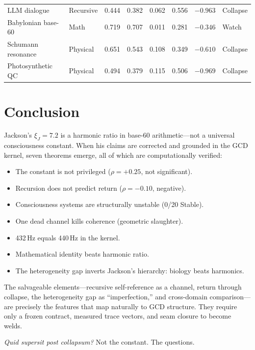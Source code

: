 \documentclass[
  aps,
  prd,
  twocolumn,
  superscriptaddress,
  nofootinbib,
  floatfix
]{revtex4-2}
\newcommand{\xiJ}{\xi_J}
\begin{document}
\begin{table}[t]
\begin{ruledtabular}
\begin{tabular}{llcccccl}
LLM dialogue         & Recursive & 0.444 & 0.382 & 0.062 & 0.556 & $-0.963$ & Collapse \\
Babylonian base-60   & Math     & 0.719 & 0.707 & 0.011 & 0.281 & $-0.346$ & Watch    \\
Schumann resonance   & Physical & 0.651 & 0.543 & 0.108 & 0.349 & $-0.610$ & Collapse \\
Photosynthetic QC    & Physical & 0.494 & 0.379 & 0.115 & 0.506 & $-0.969$ & Collapse \\
\end{tabular}
\end{ruledtabular}
\end{table}

\section{Conclusion}
\label{sec:conclusion}

Jackson's $\xiJ = 7.2$ is a harmonic ratio in base-60 arithmetic---not a
universal consciousness constant.  When his claims are corrected and
grounded in the GCD kernel, seven theorems emerge, all of which are
computationally verified:

\begin{itemize}
  \item The constant is not privileged ($\rho = +0.25$, not significant).
  \item Recursion does not predict return ($\rho = -0.10$, negative).
  \item Consciousness systems are structurally unstable (0/20 Stable).
  \item One dead channel kills coherence (geometric slaughter).
  \item 432\,Hz equals 440\,Hz in the kernel.
  \item Mathematical identity beats harmonic ratio.
  \item The heterogeneity gap inverts Jackson's hierarchy: biology beats
        harmonics.
\end{itemize}

The salvageable elements---recursive self-reference as a channel, return
through collapse, the heterogeneity gap as ``imperfection,'' and
cross-domain comparison---are precisely the features that map naturally
to GCD structure.  They require only a frozen contract, measured trace
vectors, and seam closure to become welds.

\emph{Quid supersit post collapsum?}  Not the constant.  The questions.


\end{document}
